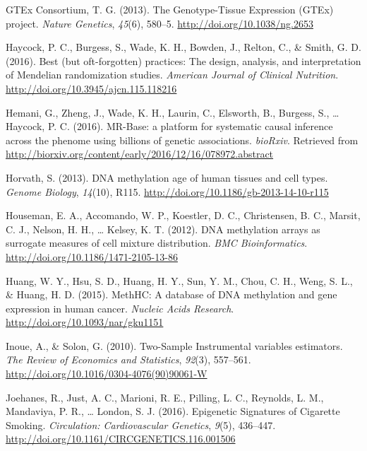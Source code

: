 \documentclass[11pt,twoside]{bristolthesis}
\newlength{\cslhangindent}
\newenvironment{cslreferences}%
  {\setlength{\parindent}{0pt}%
  \everypar{\setlength{\hangindent}{\cslhangindent}}\ignorespaces}%
  {\par}
\begin{document}
\begin{cslreferences}
\leavevmode\hypertarget{ref-GTExConsortium2013}{}%
GTEx Consortium, T. G. (2013). The Genotype-Tissue Expression (GTEx) project. \emph{Nature Genetics}, \emph{45}(6), 580--5. \url{http://doi.org/10.1038/ng.2653}

\leavevmode\hypertarget{ref-Haycock2016}{}%
Haycock, P. C., Burgess, S., Wade, K. H., Bowden, J., Relton, C., \& Smith, G. D. (2016). Best (but oft-forgotten) practices: The design, analysis, and interpretation of Mendelian randomization studies. \emph{American Journal of Clinical Nutrition}. \url{http://doi.org/10.3945/ajcn.115.118216}

\leavevmode\hypertarget{ref-Hemani2016}{}%
Hemani, G., Zheng, J., Wade, K. H., Laurin, C., Elsworth, B., Burgess, S., \ldots{} Haycock, P. C. (2016). MR-Base: a platform for systematic causal inference across the phenome using billions of genetic associations. \emph{bioRxiv}. Retrieved from \url{http://biorxiv.org/content/early/2016/12/16/078972.abstract}

\leavevmode\hypertarget{ref-Horvath2013}{}%
Horvath, S. (2013). DNA methylation age of human tissues and cell types. \emph{Genome Biology}, \emph{14}(10), R115. \url{http://doi.org/10.1186/gb-2013-14-10-r115}

\leavevmode\hypertarget{ref-Houseman2012}{}%
Houseman, E. A., Accomando, W. P., Koestler, D. C., Christensen, B. C., Marsit, C. J., Nelson, H. H., \ldots{} Kelsey, K. T. (2012). DNA methylation arrays as surrogate measures of cell mixture distribution. \emph{BMC Bioinformatics}. \url{http://doi.org/10.1186/1471-2105-13-86}

\leavevmode\hypertarget{ref-Huang2015}{}%
Huang, W. Y., Hsu, S. D., Huang, H. Y., Sun, Y. M., Chou, C. H., Weng, S. L., \& Huang, H. D. (2015). MethHC: A database of DNA methylation and gene expression in human cancer. \emph{Nucleic Acids Research}. \url{http://doi.org/10.1093/nar/gku1151}

\leavevmode\hypertarget{ref-Inoue2010}{}%
Inoue, A., \& Solon, G. (2010). Two-Sample Instrumental variables estimators. \emph{The Review of Economics and Statistics}, \emph{92}(3), 557--561. \url{http://doi.org/10.1016/0304-4076(90)90061-W}

\leavevmode\hypertarget{ref-Joehanes2016}{}%
Joehanes, R., Just, A. C., Marioni, R. E., Pilling, L. C., Reynolds, L. M., Mandaviya, P. R., \ldots{} London, S. J. (2016). Epigenetic Signatures of Cigarette Smoking. \emph{Circulation: Cardiovascular Genetics}, \emph{9}(5), 436--447. \url{http://doi.org/10.1161/CIRCGENETICS.116.001506}


\end{cslreferences}
\end{document}
